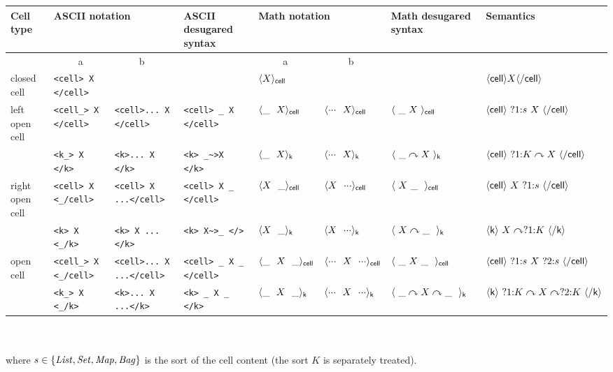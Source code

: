 \documentclass[draft]{article}
\newcommand{\List}{{\it List}}
\newcommand{\Set}{{\it Set}}
\newcommand{\Map}{{\it Map}}
\newcommand{\Bag}{{\it Bag}}
\newcommand{\kra}{\curvearrowright}
\newcommand{\mall}[3]{\langle{#3}\rangle_{\sf #2}}
\newcommand{\mprefixa}[3]{\mall{#1}{#2}{{#3}\ \ \_}}
\newcommand{\mprefixb}[3]{\mall{#1}{#2}{{#3}\ \ {\cdot}{\cdot}{\cdot}}}
\newcommand{\msuffixa}[3]{\mall{#1}{#2}{\_\ \ {#3}}}
\newcommand{\msuffixb}[3]{\mall{#1}{#2}{{\cdot}{\cdot}{\cdot}\ \ {#3}}}
\newcommand{\mmiddlea}[3]{\mall{#1}{#2}{\_ \ \ {#3}\ \ \_}}
\newcommand{\mmiddleb}[3]{\mall{#1}{#2}{{\cdot}{\cdot}{\cdot} \ \ {#3}\ \ {\cdot}{\cdot}{\cdot}}}
\newcommand{\mAnyVar}{\_}
\begin{document}
\begin{tabular}{|l|l|l|l|l|l|l|l|}
\hline
Cell type 
&
\multicolumn{2}{l|}{ASCII notation}
&
ASCII desugared syntax
&
\multicolumn{2}{l|}{Math notation}
&
Math desugared syntax
&
Semantics
\\
\hline
&
~~~~~a
&
~~~~~b
&
&
~~~~~a
&
~~~~~b
&
&
\\
\hline
closed cell 
&
\verb'<cell> X </cell>'
&
&
&
$\mall{}{cell}{X}$
&
&
&
$\langle {\sf cell} \rangle X\langle/ {\sf cell} \rangle$
\\
\hline
left open cell
&
\verb'<cell_> X </cell>'
&
\verb'<cell>... X </cell>'
&
\verb'<cell> _ X </cell>'
&
$\msuffixa{}{cell}{X}$
&
$\msuffixb{}{cell}{X}$
&
$\mall{}{cell}{~\mAnyVar~X~}$
&
$\langle {\sf cell} \rangle~ ?1{:}s~X~\langle/ {\sf cell} \rangle$
\\

&
\verb'<k_> X </k>'
&
\verb'<k>... X </k>'
&
\verb'<k> _~>X </k>'
&
$\msuffixa{}{k}{X}$
&
$\msuffixb{}{k}{X}$
&
$\mall{}{k}{~\mAnyVar\kra X~}$
&
$\langle {\sf cell} \rangle~ ?1{:}K\kra X~\langle/ {\sf cell} \rangle$
\\
\hline
right open cell
&
\verb'<cell> X <_/cell>'
&
\verb'<cell> X ...</cell>'
&
\verb'<cell> X _ </cell>'
&
$\mprefixa{}{cell}{X}$
&
$\mprefixb{}{cell}{X}$
&
$\mall{}{cell}{~X~\mAnyVar~~}$
&
$\langle {\sf cell} \rangle~X~ ?1{:}s~\langle/ {\sf cell} \rangle$
\\

&
\verb'<k> X <_/k>'
&
\verb'<k> X ...</k>'
&
\verb'<k> X~>_ </>'
&
$\mprefixa{}{k}{X}$
&
$\mprefixb{}{k}{X}$
&
$\mall{}{k}{~X\kra\mAnyVar~~}$
&
$\langle{\sf k} \rangle~ X\kra ?1{:}K~\langle/ {\sf k} \rangle$
\\
\hline

open cell
&
\verb'<cell_> X <_/cell>'
&
\verb'<cell>... X ...</cell>'
&
\verb'<cell> _ X _ </cell>'
&
$\mmiddlea{}{cell}{X}$
&
$\mmiddleb{}{cell}{X}$
&
$\mall{}{cell}{~\mAnyVar~X~\mAnyVar~~}$
&
$\langle {\sf cell} \rangle~ ?1{:}s~X~ ?2{:}s~\langle/ {\sf cell} \rangle$
\\

&
\verb'<k_> X <_/k>'
&
\verb'<k>... X ...</k>'
&
\verb'<k> _ X _ </k>'
&
$\mmiddlea{}{k}{X}$
&
$\mmiddleb{}{k}{X}$
&
$\mall{}{k}{~\mAnyVar\kra X\kra\mAnyVar~~}$
&
$\langle {\sf k} \rangle~  ?1{:}K\kra X\kra ?2{:}K~\langle/ {\sf k} \rangle$
\\
\hline
\end{tabular}
\\
\\
where $s\in\{\List,\Set,\Map,\Bag\}$ is the sort of the {\sf cell} content (the sort $K$ is separately treated).
\end{document}
